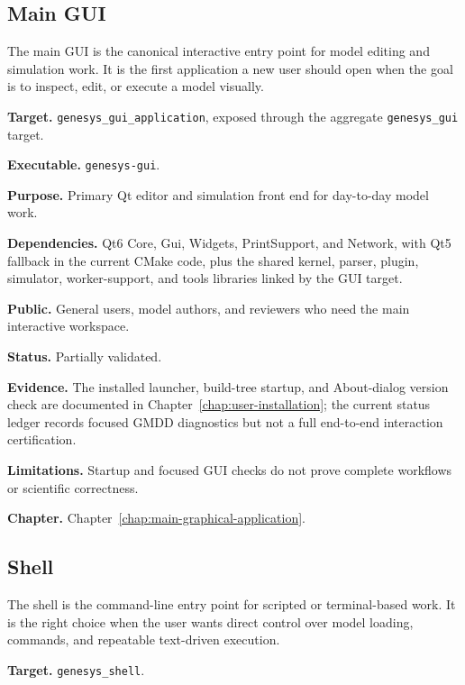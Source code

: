 \subsection{Main GUI}
\label{subsec:application-overview-main-gui}

The main GUI is the canonical interactive entry point for model editing and
simulation work. It is the first application a new user should open when the
goal is to inspect, edit, or execute a model visually.

\noindent\textbf{Target.} \texttt{genesys\_gui\_application}, exposed through the aggregate \texttt{genesys\_gui} target.

\noindent\textbf{Executable.} \texttt{genesys-gui}.

\noindent\textbf{Purpose.} Primary Qt editor and simulation front end for day-to-day model work.

\noindent\textbf{Dependencies.} Qt6 Core, Gui, Widgets, PrintSupport, and Network, with Qt5 fallback in the current CMake code, plus the shared kernel, parser, plugin, simulator, worker-support, and tools libraries linked by the GUI target.

\noindent\textbf{Public.} General users, model authors, and reviewers who need the main interactive workspace.

\noindent\textbf{Status.} Partially validated.

\noindent\textbf{Evidence.} The installed launcher, build-tree startup, and About-dialog version check are documented in Chapter~\ref{chap:user-installation}; the current status ledger records focused GMDD diagnostics but not a full end-to-end interaction certification.

\noindent\textbf{Limitations.} Startup and focused GUI checks do not prove complete workflows or scientific correctness.

\noindent\textbf{Chapter.} Chapter~\ref{chap:main-graphical-application}.

\subsection{Shell}
\label{subsec:application-overview-shell}

The shell is the command-line entry point for scripted or terminal-based work.
It is the right choice when the user wants direct control over model loading,
commands, and repeatable text-driven execution.

\noindent\textbf{Target.} \texttt{genesys\_shell}.

